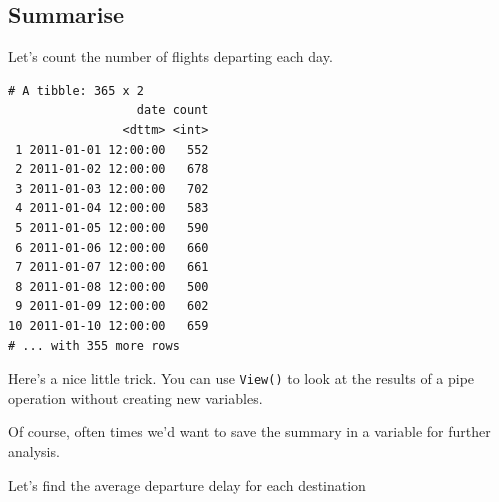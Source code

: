\documentclass[]{article}
\newenvironment{Shaded}{\begin{snugshade}}{\end{snugshade}}
\newcommand{\KeywordTok}[1]{\textcolor[rgb]{0.13,0.29,0.53}{\textbf{{#1}}}}
\newcommand{\DataTypeTok}[1]{\textcolor[rgb]{0.13,0.29,0.53}{{#1}}}
\newcommand{\StringTok}[1]{\textcolor[rgb]{0.31,0.60,0.02}{{#1}}}
\newcommand{\NormalTok}[1]{{#1}}
\theoremstyle{definition}
\theoremstyle{definition}
\theoremstyle{definition}
\theoremstyle{remark}
\begin{document}
\subsection{Summarise}\label{summarise}

Let's count the number of flights departing each day.

\begin{Shaded}
\end{Shaded}

\begin{verbatim}
# A tibble: 365 x 2
                  date count
                <dttm> <int>
 1 2011-01-01 12:00:00   552
 2 2011-01-02 12:00:00   678
 3 2011-01-03 12:00:00   702
 4 2011-01-04 12:00:00   583
 5 2011-01-05 12:00:00   590
 6 2011-01-06 12:00:00   660
 7 2011-01-07 12:00:00   661
 8 2011-01-08 12:00:00   500
 9 2011-01-09 12:00:00   602
10 2011-01-10 12:00:00   659
# ... with 355 more rows
\end{verbatim}

Here's a nice little trick. You can use \texttt{View()} to look at the
results of a pipe operation without creating new variables.

\begin{Shaded}
\end{Shaded}

Of course, often times we'd want to save the summary in a variable for
further analysis.

Let's find the average departure delay for each destination

\begin{Shaded}
\end{Shaded}
\end{document}
